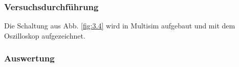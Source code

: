 \documentclass[12pt,a4paper]{article}
\begin{document}
\subsubsection{Versuchsdurchführung}
Die Schaltung aus Abb. \ref{fig:3.4} wird in Multisim aufgebaut und mit dem Oszilloskop aufgezeichnet.
\subsubsection{Auswertung}
\end{document}

